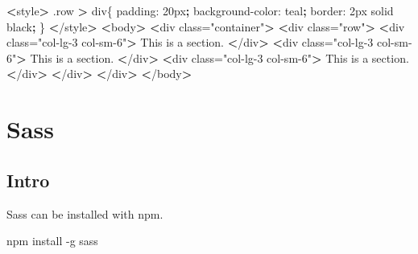 \documentclass[]{book}
\newenvironment{Shaded}{\begin{snugshade}}{\end{snugshade}}
\newcommand{\KeywordTok}[1]{\textcolor[rgb]{0.13,0.29,0.53}{\textbf{#1}}}
\newcommand{\StringTok}[1]{\textcolor[rgb]{0.31,0.60,0.02}{#1}}
\newcommand{\OperatorTok}[1]{\textcolor[rgb]{0.81,0.36,0.00}{\textbf{#1}}}
\newcommand{\ExtensionTok}[1]{#1}
\newcommand{\NormalTok}[1]{#1}
\begin{document}
\begin{Shaded}
\begin{Highlighting}[]
\OperatorTok{<}\ExtensionTok{style}\OperatorTok{>}
    \ExtensionTok{.row} \OperatorTok{>}\NormalTok{ div\{}
        \ExtensionTok{padding}\NormalTok{: 20px}\KeywordTok{;}
        \ExtensionTok{background-color}\NormalTok{: teal}\KeywordTok{;}
        \ExtensionTok{border}\NormalTok{: 2px solid black}\KeywordTok{;}
\NormalTok{    \}}
\OperatorTok{<}\NormalTok{/}\ExtensionTok{style}\OperatorTok{>}
\OperatorTok{<}\ExtensionTok{body}\OperatorTok{>}
    \OperatorTok{<}\ExtensionTok{div}\NormalTok{ class=}\StringTok{"container"}\OperatorTok{>}
        \OperatorTok{<}\ExtensionTok{div}\NormalTok{ class=}\StringTok{"row"}\OperatorTok{>}
            \OperatorTok{<}\ExtensionTok{div}\NormalTok{ class=}\StringTok{"col-lg-3 col-sm-6"}\OperatorTok{>}
                \ExtensionTok{This}\NormalTok{ is a section.}
            \OperatorTok{<}\NormalTok{/}\ExtensionTok{div}\OperatorTok{>}
            \OperatorTok{<}\ExtensionTok{div}\NormalTok{ class=}\StringTok{"col-lg-3 col-sm-6"}\OperatorTok{>}
                \ExtensionTok{This}\NormalTok{ is a section.}
            \OperatorTok{<}\NormalTok{/}\ExtensionTok{div}\OperatorTok{>}
            \OperatorTok{<}\ExtensionTok{div}\NormalTok{ class=}\StringTok{"col-lg-3 col-sm-6"}\OperatorTok{>}
                \ExtensionTok{This}\NormalTok{ is a section.}
            \OperatorTok{<}\NormalTok{/}\ExtensionTok{div}\OperatorTok{>}
        \OperatorTok{<}\NormalTok{/}\ExtensionTok{div}\OperatorTok{>}
    \OperatorTok{<}\NormalTok{/}\ExtensionTok{div}\OperatorTok{>}
\OperatorTok{<}\NormalTok{/}\ExtensionTok{body}\OperatorTok{>}
\end{Highlighting}
\end{Shaded}

\chapter{Sass}\label{sass}

\section{Intro}\label{intro}

Sass can be installed with npm.

\begin{Shaded}
\begin{Highlighting}[]
\ExtensionTok{npm}\NormalTok{ install -g sass}
\end{Highlighting}
\end{Shaded}
\end{document}
